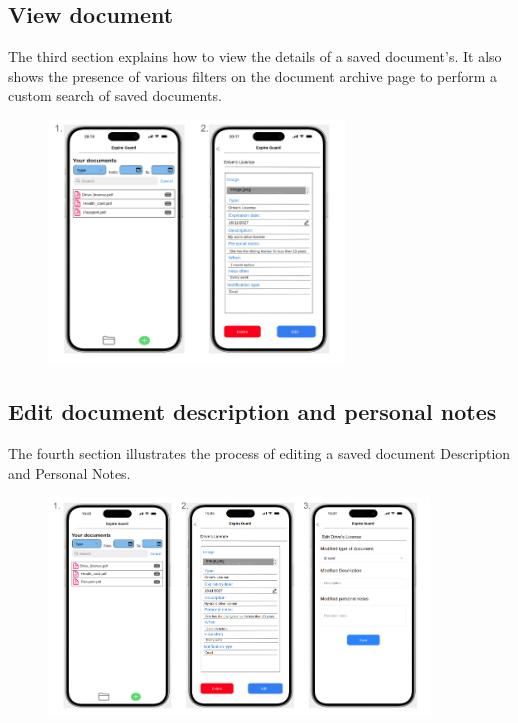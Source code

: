 	\subsection{View document}
		The third section explains how to view the details of a saved document's. It also shows the presence of various filters on the document archive page to perform a custom search of saved documents.
		\begin{figure}[htbp]
			\centering
			\includegraphics[width=0.7\textwidth]{../mockups/view_doc.png}  %
		\end{figure}
		\clearpage
	\subsection{Edit document description and personal notes}
		The fourth section illustrates the process of editing a saved document Description and Personal Notes.
		\begin{figure}[htbp]
			\centering
			\includegraphics[width=0.9\textwidth]{../mockups/edit_doc_meta_1.png}  %
		\end{figure}
	
